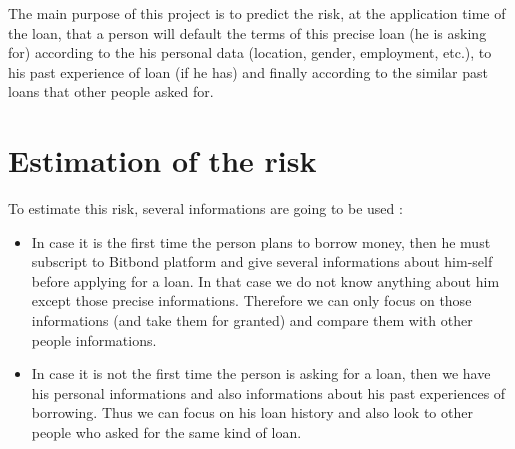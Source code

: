 The main purpose of this project is to predict the risk, at the application time of the loan, that a person will default the terms of this precise loan (he is asking for) according to the his personal data (location, gender, employment, etc.), to his past experience of loan (if he has) and finally according to the similar past loans that other people asked for.

\section{Estimation of the risk}
	To estimate this risk, several informations are going to be used :
	\begin{itemize}[font=\footnotesize]
	    \item In case it is the first time the person plans to borrow money, then he must subscript to Bitbond platform and give several informations about him-self before applying for a loan. In that case we do not know anything about him except those precise informations. Therefore we can only focus on those informations (and take them for granted) and compare them with other people informations.
	    \item In case it is not the first time the person is asking for a loan, then we have his personal informations and also informations about his past experiences of borrowing. Thus we can focus on his loan history and also look to other people who asked for the same kind of loan.
	\end{itemize}

